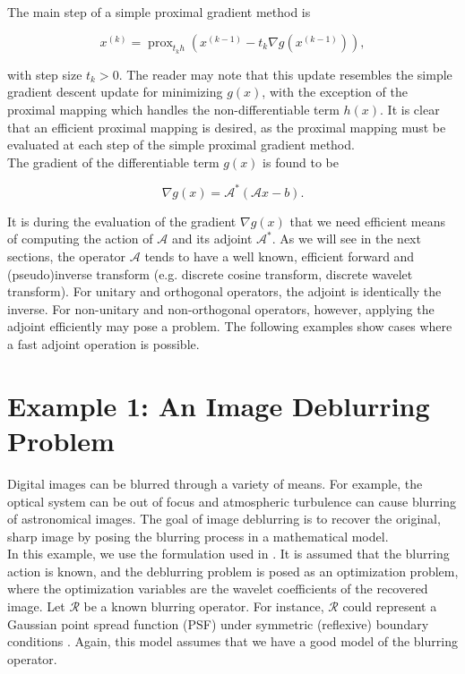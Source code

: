 \documentclass[journal]{IEEEtran}
\newcommand{\opn}[1]{\operatorname{#1}}
\begin{document}
\noindent The main step of a simple proximal gradient method is

\[ x^{(k)} = \opn{prox}_{t_k h}\left(x^{(k-1)} - t_k \nabla g(x^{(k-1)})\right), \] 

\noindent with step size $t_k>0$.  The reader may note that this update resembles the simple gradient descent update for minimizing $g(x)$, with the exception of the proximal mapping which handles the non-differentiable term $h(x)$.  It is clear that an efficient proximal mapping is desired, as the proximal mapping must be evaluated at each step of the simple proximal gradient method.\\

The gradient of the differentiable term $g(x)$ is found to be

\[ \nabla g(x) = \mathcal{A}^\ast(\mathcal{A}x-b). \] 

\noindent It is during the evaluation of the gradient $\nabla g(x)$ that we need efficient means of computing the action of $\mathcal{A}$ and its adjoint $\mathcal{A}^\ast$.  As we will see in the next sections, the operator $\mathcal{A}$ tends to have a well known, efficient forward and (pseudo)inverse transform (e.g. discrete cosine transform, discrete wavelet transform).  For unitary and orthogonal operators, the adjoint is identically the inverse.  For non-unitary and non-orthogonal operators, however, applying the adjoint efficiently may pose a problem.  The following examples show cases where a fast adjoint operation is possible.


\section{Example 1: An Image Deblurring Problem}
Digital images can be blurred through a variety of means.  For example, the optical system can be out of focus and atmospheric turbulence can cause blurring of astronomical images.  The goal of image deblurring is to recover the original, sharp image by posing the blurring process in a mathematical model.\\

In this example, we use the formulation used in \cite{beck_2009}.  It is assumed that the blurring action is known, and the deblurring problem is posed as an optimization problem, where the optimization variables are the wavelet coefficients of the recovered image.  Let $\mathcal{R}$ be a known blurring operator.  For instance, $\mathcal{R}$ could represent a Gaussian point spread function (PSF) under symmetric (reflexive) boundary conditions \cite{hansen_2006}.  Again, this model assumes that we have a good model of the blurring operator.\\
\end{document}
